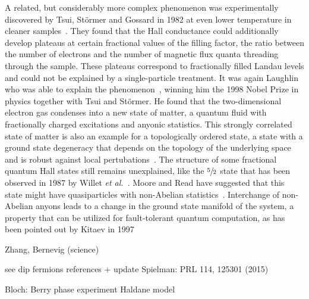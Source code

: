 A related, but considerably more complex phenomenon was experimentally discovered by Tsui, Störmer and Gossard in 1982 at even lower temperature in cleaner samples~\cite{Tsui1982}.
They found that the Hall conductance could additionally develop plateaus at certain fractional values of the filling factor, the ratio between the number of electrons and the number of magnetic flux quanta threading through the sample.
These plateaus correspond to fractionally filled Landau levels and could not be explained by a single-particle treatment.
It was again Laughlin who was able to explain the phenomenon~\cite{Laughlin1983}, winning him the 1998 Nobel Prize in physics together with Tsui and Störmer.
He found that the two-dimensional electron gas condenses into a new state of matter, a quantum fluid with fractionally charged excitations and anyonic statistics.
This strongly correlated state of matter is also an example for a topologically ordered state, a state with a ground state degeneracy that depends on the topology of the underlying space and is robust against local pertubations~\cite{Wen1990,Wen1995}.
The structure of some fractional quantum Hall states still remains unexplained, like the $\sfrac{5}{2}$ state that has been observed in 1987 by Willet \emph{et al.}~\cite{Willett1987}.
Moore and Read have suggested that this state might have quasiparticles with non-Abelian statistics~\cite{Moore1991}.
Interchange of non-Abelian anyons leads to a change in the ground state manifold of the system, a property that can be utilized for fault-tolerant quantum computation, as has been pointed out by Kitaev in 1997~\cite{Kitaev2003}

\cite{Haldane1988}

\cite{Kane2005a,Kane2005,Hasan2010}

Zhang, Bernevig (science)



see dip fermions references + update
Spielman: PRL 114, 125301 (2015)

\cite{Aidelsburger2011,Aidelsburger2013,Miyake2013}

Bloch: Berry phase experiment
Haldane model \cite{Jotzu2014}




